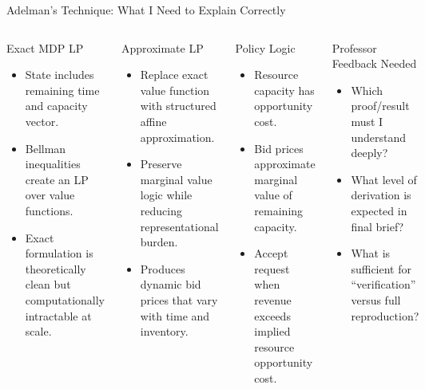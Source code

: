 \documentclass[aspectratio=169,9pt]{beamer}
\begin{document}
\begin{frame}[t]{Adelman's Technique: What I Need to Explain Correctly}
\footnotesize
\begin{columns}[T,onlytextwidth]
\begin{block}{Exact MDP LP}
\begin{itemize}
    \item State includes remaining time and capacity vector.
    \item Bellman inequalities create an LP over value functions.
    \item Exact formulation is theoretically clean but computationally intractable at scale.
\end{itemize}
\end{block}

\begin{block}{Approximate LP}
\begin{itemize}
    \item Replace exact value function with structured affine approximation.
    \item Preserve marginal value logic while reducing representational burden.
    \item Produces dynamic bid prices that vary with time and inventory.
\end{itemize}
\end{block}

\begin{block}{Policy Logic}
\begin{itemize}
    \item Resource capacity has opportunity cost.
    \item Bid prices approximate marginal value of remaining capacity.
    \item Accept request when revenue exceeds implied resource opportunity cost.
\end{itemize}
\end{block}

\begin{block}{Professor Feedback Needed}
\begin{itemize}
    \item Which proof/result must I understand deeply?
    \item What level of derivation is expected in final brief?
    \item What is sufficient for ``verification'' versus full reproduction?
\end{itemize}
\end{block}
\end{columns}
\end{frame}
\end{document}
